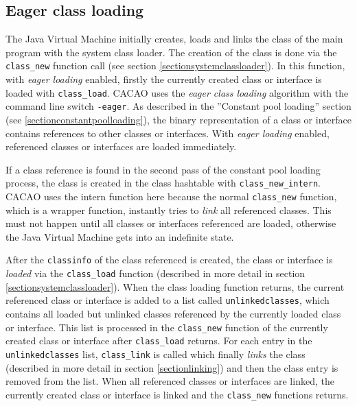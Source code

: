 \subsection{Eager class loading}
\label{sectioneagerclassloading}

The Java Virtual Machine initially creates, loads and links the class
of the main program with the system class loader. The creation of the
class is done via the \texttt{class\_new} function call (see section
\ref{sectionsystemclassloader}). In this function, with \textit{eager
loading} enabled, firstly the currently created class or interface is
loaded with \texttt{class\_load}. CACAO uses the \textit{eager class
loading} algorithm with the command line switch \texttt{-eager}. As
described in the ''Constant pool loading'' section (see
\ref{sectionconstantpoolloading}), the binary representation of a
class or interface contains references to other classes or
interfaces. With \textit{eager loading} enabled, referenced classes or
interfaces are loaded immediately.

If a class reference is found in the second pass of the constant pool
loading process, the class is created in the class hashtable with
\texttt{class\_new\_intern}. CACAO uses the intern function here
because the normal \texttt{class\_new} function, which is a wrapper
function, instantly tries to \textit{link} all referenced
classes. This must not happen until all classes or interfaces
referenced are loaded, otherwise the Java Virtual Machine gets into an
indefinite state.

After the \texttt{classinfo} of the class referenced is created, the
class or interface is \textit{loaded} via the \texttt{class\_load}
function (described in more detail in section
\ref{sectionsystemclassloader}). When the class loading function
returns, the current referenced class or interface is added to a list
called \texttt{unlinkedclasses}, which contains all loaded but
unlinked classes referenced by the currently loaded class or
interface. This list is processed in the \texttt{class\_new} function
of the currently created class or interface after \texttt{class\_load}
returns. For each entry in the \texttt{unlinkedclasses} list,
\texttt{class\_link} is called which finally \textit{links} the class
(described in more detail in section \ref{sectionlinking}) and then
the class entry is removed from the list. When all referenced classes
or interfaces are linked, the currently created class or interface is
linked and the \texttt{class\_new} functions returns.



